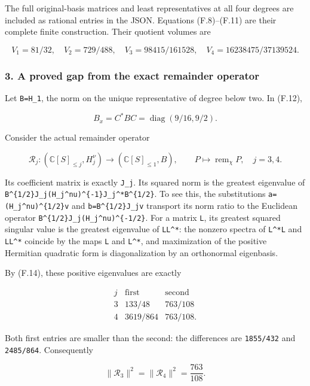 The full original-basis matrices and least representatives at all four degrees are included as rational entries in the JSON. Equations (F.8)--(F.11) are their complete finite construction. Their quotient volumes are

\[
V_1=81/32,\quad V_2=729/488,\quad
V_3=98415/161528,\quad V_4=16238475/37139524.
\tag{F.15}
\]

\subsubsection{3. A proved gap from the exact remainder operator}\label{endpoint-restriction_fixture--a-proved-gap-from-the-exact-remainder-operator}

Let \nolinkurl{B=H_1}, the norm on the unique representative of degree below two. In (F.12),

\[
B_x=C^*BC=\operatorname{diag}(9/16,9/2).
\]

Consider the actual remainder operator

\[
\mathcal R_j:(\mathbb C[S]_{\le j},H_j^\nu)
\longrightarrow(\mathbb C[S]_{\le1},B),\qquad
P\longmapsto\operatorname{rem}_\chi P,
\quad j=3,4.
\tag{F.16}
\]

Its coefficient matrix is exactly \nolinkurl{J_j}. Its squared norm is the greatest eigenvalue of \texttt{B\^{}\{1/2\}J\_j(H\_j\^{}nu)\^{}\{-1\}J\_j\^{}*B\^{}\{1/2\}}. To see this, the substitutions \texttt{a=(H\_j\^{}nu)\^{}\{1/2\}v} and \texttt{b=B\^{}\{1/2\}J\_jv} transport its norm ratio to the Euclidean operator \texttt{B\^{}\{1/2\}J\_j(H\_j\^{}nu)\^{}\{-1/2\}}. For a matrix \nolinkurl{L}, its greatest squared singular value is the greatest eigenvalue of \texttt{LL\^{}*}: the nonzero spectra of \texttt{L\^{}*L} and \texttt{LL\^{}*} coincide by the maps \nolinkurl{L} and \texttt{L\^{}*}, and maximization of the positive Hermitian quadratic form is diagonalization by an orthonormal eigenbasis.

By (F.14), these positive eigenvalues are exactly

\[
\begin{array}{c|cc}
j&\text{first}&\text{second}\\\hline
3&133/48&763/108\\
4&3619/864&763/108.
\end{array}
\]

Both first entries are smaller than the second: the differences are \nolinkurl{1855/432} and \nolinkurl{2485/864}. Consequently

\[
\boxed{\|\mathcal R_3\|^2=\|\mathcal R_4\|^2=\frac{763}{108}.}
\tag{F.17}
\]

